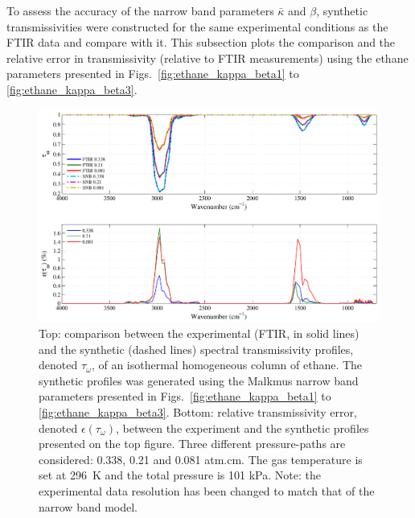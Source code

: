 To assess the accuracy of the narrow band parameters $\bar{\kappa}$ and $\beta$, synthetic transmissivities were constructed for the same experimental conditions as the FTIR data and compare with it. This subsection plots the comparison and the relative error in transmissivity (relative to FTIR measurements) using the ethane parameters presented in Figs.~\ref{fig:ethane_kappa_beta1} to \ref{fig:ethane_kappa_beta3}.

\begin{figure}[!h]
\includegraphics[width=\textwidth]{Figures/Comparison_Fit_Ethane_MALKMUS_Temp296K.pdf}
\caption{Top: comparison between the experimental (FTIR, in solid lines) and the synthetic (dashed lines) spectral transmissivity profiles, denoted $\tau_{\omega}$, of an isothermal homogeneous column of ethane. The synthetic profiles was generated using the Malkmus narrow band parameters presented in Figs.~\ref{fig:ethane_kappa_beta1} to \ref{fig:ethane_kappa_beta3}. Bottom: relative transmissivity error, denoted $\epsilon{(\tau_{\omega})}$, between the experiment and the synthetic profiles presented on the top figure. Three different pressure-paths are considered: 0.338, 0.21 and 0.081 atm.cm. The gas temperature is set at 296~K and the total pressure is 101 kPa. Note: the experimental data resolution has been changed to match that of the narrow band model. \label{fig:ethane_SNBVerify_296K}}
\end{figure}

